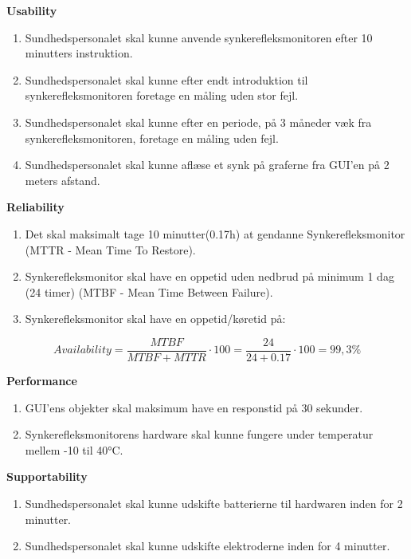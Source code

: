 \textbf{Usability}
\begin{enumerate}
\item Sundhedspersonalet skal kunne anvende synkerefleksmonitoren efter 10 minutters instruktion. 
\item Sundhedspersonalet skal kunne efter endt introduktion til synkerefleksmonitoren foretage en måling uden stor fejl.
\item Sundhedspersonalet skal kunne efter en periode, på 3 måneder væk fra synkerefleksmonitoren, foretage en måling uden fejl.
\item Sundhedspersonalet skal kunne aflæse et synk på graferne fra GUI'en på 2 meters afstand. 
\end{enumerate}
                                                                                                
\textbf{Reliability}
\begin{enumerate}[resume]
\item Det skal maksimalt tage 10 minutter(0.17h) at gendanne Synkerefleksmonitor (MTTR - Mean Time To Restore).
\item Synkerefleksmonitor skal have en oppetid uden nedbrud på minimum 1 dag (24 timer) (MTBF - Mean Time Between Failure).  
\item Synkerefleksmonitor skal have en oppetid/køretid på: 

\end{enumerate}


\begin{equation}
Availability = \frac{MTBF}{MTBF+MTTR}\cdot100 = \frac{24}{24+0.17}\cdot100 = 99,3 \%
\end{equation}

					
\textbf{Performance}
\begin{enumerate}[resume]


\item GUI'ens objekter skal maksimum have en responstid på 30 sekunder.
\item Synkerefleksmonitorens hardware skal kunne fungere under temperatur mellem  -10  til   \ang{40}C.

\end{enumerate}

\pagebreak
\textbf{Supportability}
\begin{enumerate}[resume]
\item Sundhedspersonalet skal kunne udskifte batterierne til hardwaren inden for 2 minutter.
\item Sundhedspersonalet skal kunne udskifte elektroderne inden for 4 minutter.

\end{enumerate}

\newpage

\newpage
\listoffigures
\newpage
\listoftables

